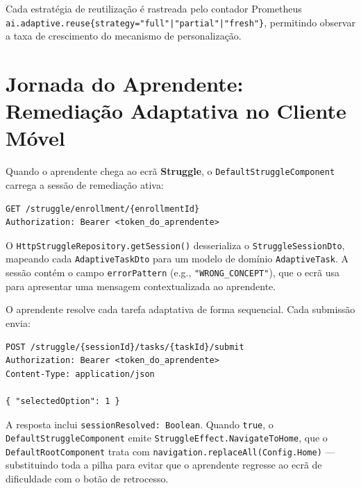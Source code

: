 Cada estratégia de reutilização é rastreada pelo contador Prometheus
\texttt{ai.adaptive.reuse\{strategy="full"|"partial"|"fresh"\}},
permitindo observar a taxa de crescimento do mecanismo de personalização.

\section{Jornada do Aprendente: Remediação Adaptativa no Cliente Móvel}
\label{sec:struggle_mobile}

Quando o aprendente chega ao ecrã \textbf{Struggle}, o
\texttt{DefaultStruggleComponent} carrega a sessão de remediação ativa:

\begin{verbatim}
GET /struggle/enrollment/{enrollmentId}
Authorization: Bearer <token_do_aprendente>
\end{verbatim}

O \texttt{HttpStruggleRepository.getSession()} desserializa o
\texttt{StruggleSessionDto}, mapeando cada \texttt{AdaptiveTaskDto} para
um modelo de domínio \texttt{AdaptiveTask}.
A sessão contém o campo \texttt{errorPattern} (e.g.,
\texttt{"WRONG\_CONCEPT"}), que o ecrã usa para apresentar uma mensagem
contextualizada ao aprendente.

O aprendente resolve cada tarefa adaptativa de forma sequencial.
Cada submissão envia:

\begin{verbatim}
POST /struggle/{sessionId}/tasks/{taskId}/submit
Authorization: Bearer <token_do_aprendente>
Content-Type: application/json

{ "selectedOption": 1 }
\end{verbatim}

A resposta inclui \texttt{sessionResolved: Boolean}.
Quando \texttt{true}, o \texttt{DefaultStruggleComponent} emite
\texttt{StruggleEffect.NavigateToHome}, que o \texttt{DefaultRootComponent}
trata com \texttt{navigation.replaceAll(Config.Home)} — substituindo toda
a pilha para evitar que o aprendente regresse ao ecrã de dificuldade com
o botão de retrocesso.

